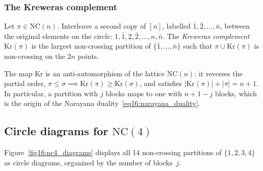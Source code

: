 \documentclass[11pt,letterpaper]{article}
\theoremstyle{plain}
\theoremstyle{definition}
\theoremstyle{remark}
\begin{document}
\subsubsection{The Kreweras complement}

Let $\pi \in \mathrm{NC}(n)$.  Interleave a second copy of $[n]$,
labelled $\bar{1}, \bar{2}, \dots, \bar{n}$, between the original elements on
the circle: $1, \bar{1}, 2, \bar{2}, \dots, n, \bar{n}$.  The
\emph{Kreweras complement} $\mathrm{Kr}(\pi)$ is the largest non-crossing
partition of $\{\bar{1},\dots,\bar{n}\}$ such that $\pi \cup \mathrm{Kr}(\pi)$
is non-crossing on the $2n$ points.

The map $\mathrm{Kr}$ is an anti-automorphism of the lattice $\mathrm{NC}(n)$:
it reverses the partial order, $\pi \le \sigma \implies
\mathrm{Kr}(\pi) \ge \mathrm{Kr}(\sigma)$, and satisfies
$|\mathrm{Kr}(\pi)| + |\pi| = n + 1$.  In particular, a partition with $j$
blocks maps to one with $n + 1 - j$ blocks, which is the origin of the
Narayana duality~\eqref{eq16:narayana_duality}.

\subsection{Circle diagrams for \texorpdfstring{$\mathrm{NC}(4)$}{NC(4)}}

Figure~\ref{fig16:nc4_diagrams} displays all 14 non-crossing partitions of
$\{1,2,3,4\}$ as circle diagrams, organized by the number of blocks~$j$.
\end{document}
